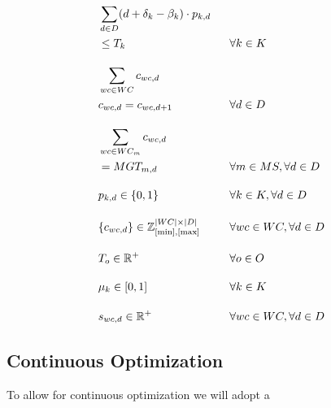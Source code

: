 \documentclass[runningheads]{llncs}
\begin{document}
\begin{alignat}{2}
    &\sum_{d \in D} (d + \delta_k - \beta_k) \cdot p_{k,d}                                      \ \ && \notag \\
    &\leq  T_k                                                                                  \ \ && \forall k \in K                              \label{eqn:tactical_tardiness} \\[1em]
    &\sum_{wc \in WC} c_{wc,d}                                                                  \ \ && \notag \\
    &c_{wc,d} = c_{wc,d+1}                                                                      \ \ && \forall d \in D                              \label{eqn:tactical_consistent_crew} \\[1em]
    &\sum_{wc \in WC_{m}} c_{wc,d}                                                              \ \ && \notag \\
    & = MGT_{m,d}                                                                               \ \ && \forall m \in MS, \forall d \in D            \label{eqn:tactical_multiskill} \\[1em]
    &p_{k,d} \in \{0,1\}                                                                        \ \ && \forall k \in K, \forall d \in D             \label{eqn:tactical_pattern_variable} \\[1em]
    &\{c_{wc,d}\} \in \mathbb{Z}^{|WC| \times |D|}_{[\text{min}], [\text{max}]}                 \ \ && \forall wc \in WC, \forall d \in D           \label{eqn:tactical_crew_variable} \\[1em]
    &T_o \in \mathbb{R}^{+}                                                                     \ \ && \forall o \in O                              \label{eqn:tactical_tardiness_variable} \\[1em]
    &\mu_k \in [0,1]                                                                            \ \ && \forall k \in K                              \label{eqn:tactical_finish_start_difference} \\[1em]
    &s_{wc,d} \in \mathbb{R}^{+}                                                                \ \ && \forall wc \in WC, \forall d \in D           \label{eqn:tactical_excess_capacity_variable}  
\end{alignat}


\subsection{Continuous Optimization}
To allow for continuous optimization we will adopt a 
\end{document}
